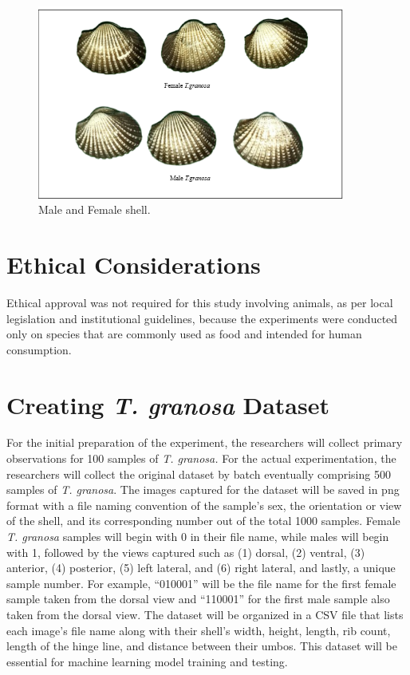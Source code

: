 \begin{figure}[!htbp]
	\centering
	\includegraphics[width=0.9\textwidth]{figures/male-female T.granosa.png}
	\caption{Male and Female \Tegillarcagranosa shell.}
\end{figure}

\section{Ethical Considerations}
\label{sec:ethical}

Ethical approval was not required for this study involving animals, as per local legislation and institutional guidelines, because the experiments were conducted only on species that are commonly used as food and intended for human consumption. 


\section{Creating \textit{T. granosa} Dataset}
\label{sec:dataset}

For the initial preparation of the experiment, the researchers will collect primary observations for 100 samples of \textit{T. granosa.} For the actual experimentation, the researchers will collect the original dataset by batch eventually comprising 500 samples of \textit{T. granosa}. The images captured for the dataset will be saved in png format with a file naming convention of the sample’s sex, the orientation or view of the shell, and its corresponding number out of the total 1000 samples. Female \textit{T. granosa} samples will begin with 0 in their file name, while males will begin with 1, followed by the views captured such as (1) dorsal, (2) ventral, (3) anterior, (4) posterior, (5) left lateral, and (6) right lateral, and lastly, a unique sample number. For example, “010001” will be the file name for the first female sample taken from the dorsal view and “110001” for the first male sample also taken from the dorsal view. The dataset will be organized in a CSV file that lists each image’s file name along with their shell’s width, height, length, rib count, length of the hinge line, and distance between their umbos. This dataset will be essential for machine learning model training and testing. 


